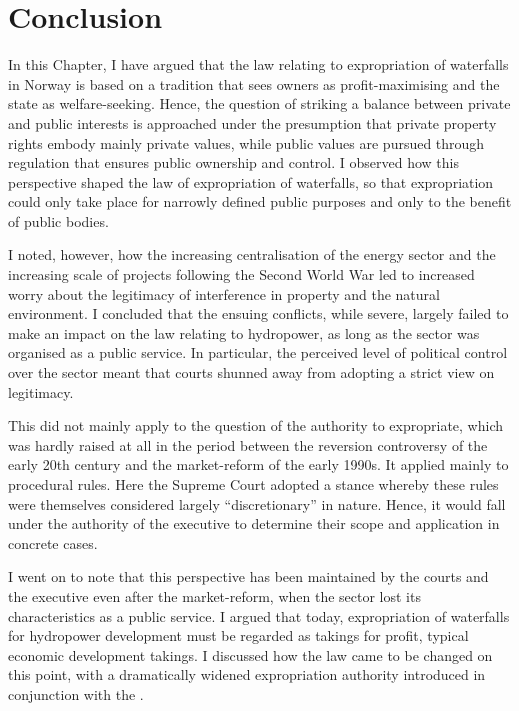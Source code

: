 \section{Conclusion}\label{conc}

In this Chapter, I have argued that the law relating to expropriation of waterfalls in Norway is based on a tradition that sees owners as profit-maximising and the state as welfare-seeking. Hence, the question of striking a balance between private and public interests is approached under the presumption that private property rights embody mainly private values, while public values are pursued through regulation that ensures public ownership and control. I observed how this perspective shaped the law of expropriation of waterfalls, so that expropriation could only take place for narrowly defined public purposes and only to the benefit of public bodies.

I noted, however, how the increasing centralisation of the energy sector and the increasing scale of projects following the Second World War led to increased worry about the legitimacy of interference in property and the natural environment. I concluded that the ensuing conflicts, while severe, largely failed to make an impact on the law relating to hydropower, as long as the sector was organised as a public service. In particular, the perceived level of political control over the sector meant that courts shunned away from adopting a strict view on legitimacy. 

This did not mainly apply to the question of the authority to expropriate, which was hardly raised at all in the period between the reversion controversy of the early 20th century and the market-reform of the early 1990s. It applied mainly to procedural rules. Here the Supreme Court adopted a stance whereby these rules were themselves considered largely ``discretionary'' in nature. Hence, it would fall under the authority of the executive to determine their scope and application in concrete cases.

I went on to note that this perspective has been maintained by the courts and the executive even after the market-reform, when the sector lost its characteristics as a public service. I argued that today, expropriation of waterfalls for hydropower development must be regarded as takings for profit, typical economic development takings. I discussed how the law came to be changed on this point, with a dramatically widened expropriation authority introduced in conjunction with the \cite{wra00}.

